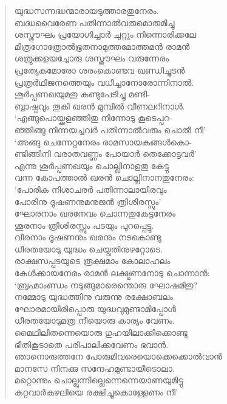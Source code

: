 \begin{verse}
യുദ്ധസന്നദ്ധന്മാരായടുത്താരതുനേരം.\\
ബദ്ധവൈരേണ പതിന്നാല്‍വരുമൊരുമിച്ചു\\
ശസ്ത്രൗഘം പ്രയോഗിച്ചാര്‍ ചുറ്റും നിന്നൊരിക്കലേ\\
മിത്രഗോത്രോല്‍ഭൂതനാമുത്തമോത്തമന്‍ രാമന്‍\\
ശത്രുക്കളയച്ചോരു ശസ്ത്രൗഘം വരുന്നേരം\\
പ്രത്യേകമോരോ ശരംകൊണ്ടവ ഖണ്ഡിച്ചുടന്‍\\
പ്രത്രര്‍ഥിജനത്തെയും വധിച്ചാനോരോന്നിനാല്‍.\\
ശൂര്‍പ്പണഖയുമതു കണ്ടുപേടിച്ചു മണ്ടി-\\
ബ്ബാഷ്പവും തൂകി ഖരന്‍ മുമ്പില്‍ വീണലറിനാള്‍.\\
‘എങ്ങുപൊയ്ക്കളഞ്ഞിതു നിന്നോടു കൂടെപ്പറ-\\
ഞ്ഞിങ്ങു നിന്നയച്ചവര്‍ പതിന്നാല്‍വരും ചൊല്‍ നീ’\\
‘അങ്ങു ചെന്നേറ്റനേരം രാമസായകങ്ങള്‍കൊ-\\
ണ്ടിങ്ങിനി വരാതവണ്ണം പോയാര്‍ തെക്കോട്ടവര്‍’\\
എന്നു ശൂര്‍പ്പണഖയും ചൊല്ലിനാളതു കേട്ടു\\
വന്ന കോപത്താല്‍ ഖരന്‍ ചൊല്ലിനാനതുനേരം:\\
‘പോരിക നിശാചരര്‍ പതിന്നാലായിരവും\\
പോരിനു ദൂഷണനുമനുജന്‍ ത്രിശിരസ്സും’\\
ഘോരനാം ഖരനേവം ചൊന്നതുകേട്ടനേരം\\
ശൂരനാം ത്രിശിരസ്സും പടയും പുറപ്പെട്ടു.\\
വീരനാം ദൂഷണനും ഖരനും നടകൊണ്ടു\\
ധീരതയോടു യുദ്ധം ചെയ്വതിനുഴറ്റോടെ.\\
രാക്ഷസപ്പടയുടെ രൂക്ഷമാം കോലാഹലം\\
കേള്‍ക്കായനേരം രാമന്‍ ലക്ഷ്മണനോടു ചൊന്നാന്‍:\\
‘ബ്രഹ്മാംണ്ഡം നടുങ്ങുമാരെന്തൊരു ഘോഷമിതു?\\
നമ്മോടു യുദ്ധത്തിനു വരുന്നു രക്ഷോബലം\\
ഘോരമായിരിപ്പൊരു യുദ്ധവുമുണ്ടാമിപ്പോള്‍\\
ധീരതയോടുമത്ര നീയൊരു കാര്യം വേണം.\\
മൈഥിലിതന്നെയൊരു ഗുഹയിലാക്കിക്കൊണ്ടു\\
ഭീതികൂടാതെ പരിപാലിക്കവേണം ഭവാന്‍.\\
ഞാനൊരുത്തനേ പോരുമിവരെയൊക്കെക്കൊല്‍വാന്‍\\
മാനസേ നിനക്കു സന്ദേഹമുണ്ടായീടൊലാ.\\
മറ്റൊന്നും ചൊല്ലുന്നില്ലെന്നെന്നെയാണയുമിട്ടു\\
കറ്റവാര്‍കുഴലിയെ രക്ഷിച്ചുകൊള്ളേണം നീ’\\

\end{verse}
